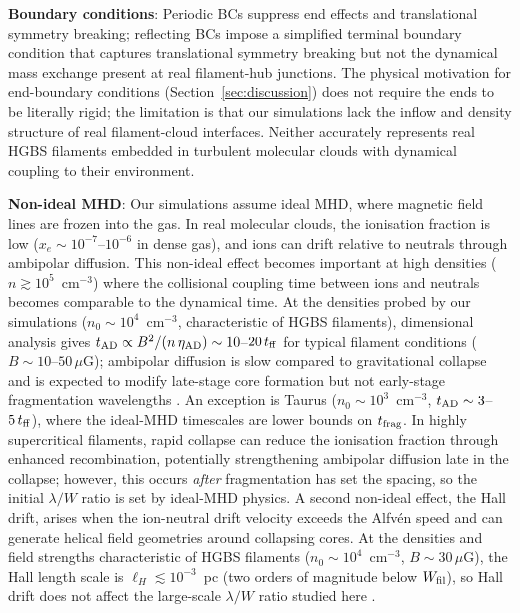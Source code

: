 \documentclass[twoside,twocolumn]{mnras}
\begin{document}
\textbf{Boundary conditions}: Periodic BCs suppress end effects and translational
symmetry breaking; reflecting BCs impose a simplified terminal boundary condition that captures translational symmetry breaking but not the dynamical mass exchange present at real filament-hub junctions. The physical motivation for end-boundary conditions (Section~\ref{sec:discussion}) does not require the ends to be literally rigid; the limitation is that our simulations lack the inflow and density structure of real filament-cloud interfaces. Neither accurately represents real HGBS filaments embedded in turbulent molecular clouds with dynamical coupling to their environment.

\textbf{Non-ideal MHD}: Our simulations assume ideal MHD, where magnetic field lines
are frozen into the gas. In real molecular clouds, the ionisation fraction is low
($x_e \sim 10^{-7}$--$10^{-6}$ in dense gas), and ions can drift relative to neutrals
through ambipolar diffusion. This non-ideal effect becomes important at high densities
($n \gtrsim 10^5$~cm$^{-3}$) where the collisional coupling time between ions and
neutrals becomes comparable to the dynamical time. At the densities probed by our
simulations ($n_0 \sim 10^4$~cm$^{-3}$, characteristic of HGBS filaments), dimensional
analysis gives $t_{\rm AD} \propto B^2 / (n\,\eta_{\rm AD}) \sim 10$--$20\,t_{\rm ff}$
for typical filament conditions ($B \sim 10$--$50\,\mu$G); ambipolar diffusion is slow
compared to gravitational collapse and is expected to modify late-stage core formation
but not early-stage fragmentation wavelengths \citep{Nakamura2005, Tassis2004}. An
exception is Taurus ($n_0 \sim 10^3$~cm$^{-3}$, $t_{\rm AD} \sim 3$--$5\,t_{\rm ff}$),
where the ideal-MHD timescales are lower bounds on $t_{\rm frag}$. In highly supercritical
filaments, rapid collapse can reduce the ionisation fraction through enhanced recombination,
potentially strengthening ambipolar diffusion late in the collapse; however, this occurs
\textit{after} fragmentation has set the spacing, so the initial $\lambda/W$ ratio is set
by ideal-MHD physics. A second non-ideal effect, the Hall drift, arises when the ion-neutral
drift velocity exceeds the Alfv\'{e}n speed and can generate helical field geometries around
collapsing cores. At the densities and field strengths characteristic of HGBS filaments
($n_0 \sim 10^4$~cm$^{-3}$, $B \sim 30\,\mu$G), the Hall length scale is $\ell_H \lesssim
10^{-3}$~pc (two orders of magnitude below $W_{\rm fil}$), so Hall drift does not affect
the large-scale $\lambda/W$ ratio studied here \citep{Nakamura2008}.
\end{document}
